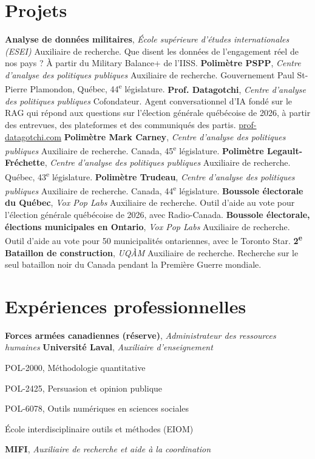 \documentclass[10pt,letterpaper]{article}
\begin{document}
\section*{Projets}
  {\textbf{Analyse de données militaires}, \textit{École supérieure d'études internationales (ESEI)}}
  {Auxiliaire de recherche. Que disent les données de l'engagement réel de nos pays ?
   À partir du Military Balance+ de l'IISS.}
  {\textbf{Polimètre PSPP}, \textit{Centre d'analyse des politiques publiques}}
  {Auxiliaire de recherche. Gouvernement Paul St-Pierre Plamondon, Québec, 44\textsuperscript{e} législature.}
  {\textbf{Prof. Datagotchi}, \textit{Centre d'analyse des politiques publiques}}
  {Cofondateur. Agent conversationnel d'IA fondé sur le RAG qui répond aux questions sur l'élection générale
   québécoise de 2026, à partir des entrevues, des plateformes et des communiqués des partis.
   \href{https://prof-datagotchi.com/}{prof-datagotchi.com}}
  {\textbf{Polimètre Mark Carney}, \textit{Centre d'analyse des politiques publiques}}
  {Auxiliaire de recherche. Canada, 45\textsuperscript{e} législature.}
  {\textbf{Polimètre Legault-Fréchette}, \textit{Centre d'analyse des politiques publiques}}
  {Auxiliaire de recherche. Québec, 43\textsuperscript{e} législature.}
  {\textbf{Polimètre Trudeau}, \textit{Centre d'analyse des politiques publiques}}
  {Auxiliaire de recherche. Canada, 44\textsuperscript{e} législature.}
  {\textbf{Boussole électorale du Québec}, \textit{Vox Pop Labs}}
  {Auxiliaire de recherche. Outil d'aide au vote pour l'élection générale québécoise de 2026, avec Radio-Canada.}
  {\textbf{Boussole électorale, élections municipales en Ontario}, \textit{Vox Pop Labs}}
  {Auxiliaire de recherche. Outil d'aide au vote pour 50 municipalités ontariennes, avec le Toronto Star.}
  {\textbf{2\textsuperscript{e} Bataillon de construction}, \textit{UQÀM}}
  {Auxiliaire de recherche. Recherche sur le seul bataillon noir du Canada pendant la Première Guerre mondiale.}

\section*{Expériences professionnelles}
  {\textbf{Forces armées canadiennes (réserve)}, \textit{Administrateur des ressources humaines}}{}
  {\textbf{Université Laval}, \textit{Auxiliaire d'enseignement}}{}
\begin{cvitems}
\item POL-2000, Méthodologie quantitative
\item POL-2425, Persuasion et opinion publique
\item POL-6078, Outils numériques en sciences sociales
\item École interdisciplinaire outils et méthodes (EIOM)
\end{cvitems}
  {\textbf{MIFI}, \textit{Auxiliaire de recherche et aide à la coordination}}{}
\end{document}
